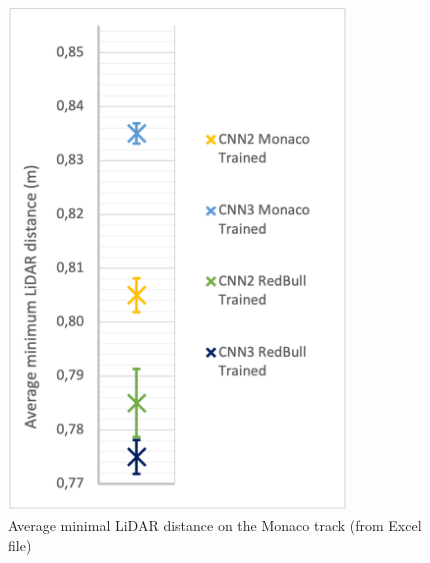 \begin{figure}
\begin{minipage}{0.45\textwidth}
        \includegraphics[width=0.8\textwidth]{Figures/H3_LiDAR.png}
        \caption{Average minimal LiDAR distance on the Monaco track (from Excel file)}
        \label{h3_lidar}
    \end{minipage}
\end{figure}

